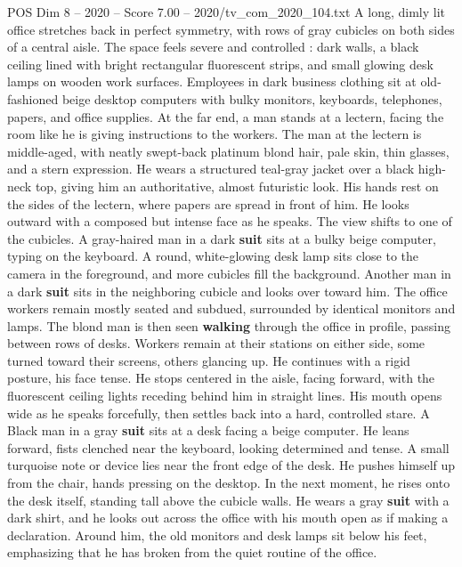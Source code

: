\begin{textsample}{POS Dim 8 – 2020 – Score 7.00 – 2020/tv\_com\_2020\_104.txt}  \label{ex:f8_pos_054}
A long, dimly lit office stretches back in perfect symmetry, with rows of gray cubicles on both sides of a central aisle.
The space feels severe and controlled : dark walls, a black ceiling lined with bright rectangular fluorescent strips, and small glowing desk lamps on wooden work surfaces.
Employees in dark business clothing sit at old-fashioned beige desktop computers with bulky monitors, keyboards, telephones, papers, and office supplies.
At the far end, a man stands at a lectern, facing the room like he is giving instructions to the workers.
The man at the lectern is middle-aged, with neatly swept-back platinum blond hair, pale skin, thin glasses, and a stern expression.
He wears a structured teal-gray jacket over a black high-neck top, giving him an authoritative, almost futuristic look.
His hands rest on the sides of the lectern, where papers are spread in front of him.
He looks outward with a composed but intense face as he speaks.
The view shifts to one of the cubicles.
A gray-haired man in a dark \textbf{suit} sits at a bulky beige computer, typing on the keyboard.
A round, white-glowing desk lamp sits close to the camera in the foreground, and more cubicles fill the background.
Another man in a dark \textbf{suit} sits in the neighboring cubicle and looks over toward him.
The office workers remain mostly seated and subdued, surrounded by identical monitors and lamps.
The blond man is then seen \textbf{walking} through the office in profile, passing between rows of desks.
Workers remain at their stations on either side, some turned toward their screens, others glancing up.
He continues with a rigid posture, his face tense.
He stops centered in the aisle, facing forward, with the fluorescent ceiling lights receding behind him in straight lines.
His mouth opens wide as he speaks forcefully, then settles back into a hard, controlled stare.
A Black man in a gray \textbf{suit} sits at a desk facing a beige computer.
He leans forward, fists clenched near the keyboard, looking determined and tense.
A small turquoise note or device lies near the front edge of the desk.
He pushes himself up from the chair, hands pressing on the desktop.
In the next moment, he rises onto the desk itself, standing tall above the cubicle walls.
He wears a gray \textbf{suit} with a dark shirt, and he looks out across the office with his mouth open as if making a declaration.
Around him, the old monitors and desk lamps sit below his feet, emphasizing that he has broken from the quiet routine of the office.

\end{textsample}
